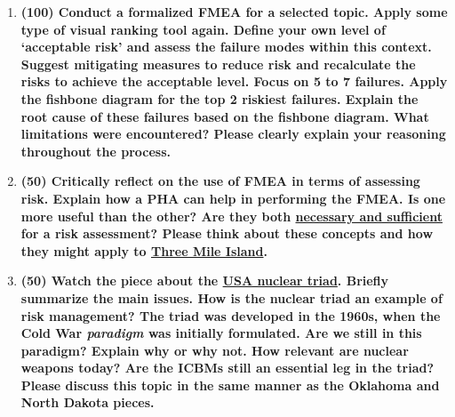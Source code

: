\documentclass[11pt,a4paper]{article}
\begin{document}
\begin{enumerate}[leftmargin=*,topsep=0pt,font=\bfseries]
    \item\textbf{(100) Conduct a formalized FMEA for a selected topic. Apply some type of visual ranking tool again. Define your own level of `acceptable risk' and assess the failure modes within this context. Suggest mitigating measures to reduce risk and recalculate the risks to achieve the acceptable level. Focus on 5 to 7 failures. Apply the fishbone diagram for the top 2 riskiest failures. Explain the root cause of these failures based on the fishbone diagram. What limitations were encountered? Please clearly explain your reasoning throughout the process.}
        \vspace{\baselineskip}
    
        
        
        
        
        
        
        
        
        
        
        
        
        
        \newpage
    \item\textbf{(50) Critically reflect on the use of FMEA in terms of assessing risk. Explain how a PHA can help in performing the FMEA. Is one more useful than the other? Are they both \href{https://en.wikipedia.org/wiki/Necessity_and_sufficiency}{necessary and sufficient} for a risk assessment? Please think about these concepts and how they might apply to \href{../ref/root-cause-tmi.pdf}{Three Mile Island}.}
        \vspace{\baselineskip}
        
        
        
        
        
        
        
        
        
        
        
        
        
        
        \newpage
    \item\textbf{(50) Watch the piece about the \href{http://www.pbs.org/newshour/bb/as-pentagon-overhauls-nuclear-triad-critics-advise-caution/}{USA nuclear triad}. Briefly summarize the main issues. How is the nuclear triad an example of risk management? The triad was developed in the 1960s, when the Cold War \textit{paradigm} was initially formulated. Are we still in this paradigm? Explain why or why not. How relevant are nuclear weapons today? Are the ICBMs still an essential leg in the triad? Please discuss this topic in the same manner as the Oklahoma and North Dakota pieces.}
        \vspace{\baselineskip}


\end{enumerate}
\end{document}
